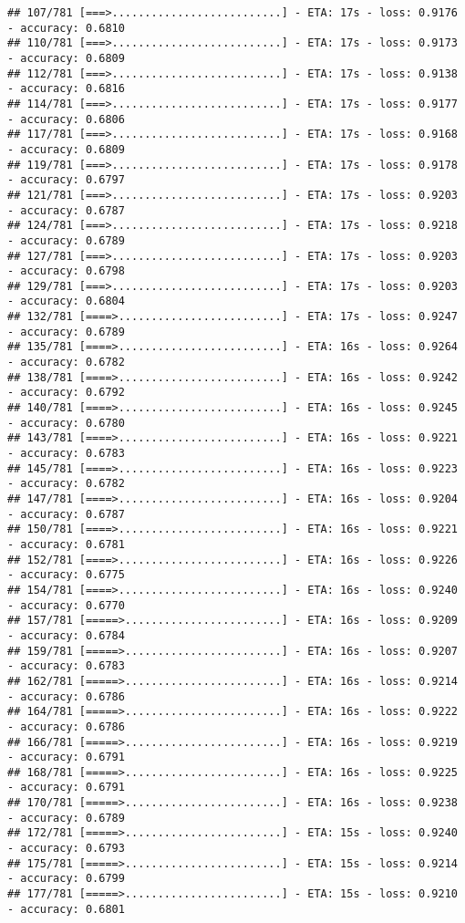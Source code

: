 \documentclass[
]{article}
\begin{document}
\begin{verbatim}
## 107/781 [===>..........................] - ETA: 17s - loss: 0.9176 - accuracy: 0.6810
## 110/781 [===>..........................] - ETA: 17s - loss: 0.9173 - accuracy: 0.6809
## 112/781 [===>..........................] - ETA: 17s - loss: 0.9138 - accuracy: 0.6816
## 114/781 [===>..........................] - ETA: 17s - loss: 0.9177 - accuracy: 0.6806
## 117/781 [===>..........................] - ETA: 17s - loss: 0.9168 - accuracy: 0.6809
## 119/781 [===>..........................] - ETA: 17s - loss: 0.9178 - accuracy: 0.6797
## 121/781 [===>..........................] - ETA: 17s - loss: 0.9203 - accuracy: 0.6787
## 124/781 [===>..........................] - ETA: 17s - loss: 0.9218 - accuracy: 0.6789
## 127/781 [===>..........................] - ETA: 17s - loss: 0.9203 - accuracy: 0.6798
## 129/781 [===>..........................] - ETA: 17s - loss: 0.9203 - accuracy: 0.6804
## 132/781 [====>.........................] - ETA: 17s - loss: 0.9247 - accuracy: 0.6789
## 135/781 [====>.........................] - ETA: 16s - loss: 0.9264 - accuracy: 0.6782
## 138/781 [====>.........................] - ETA: 16s - loss: 0.9242 - accuracy: 0.6792
## 140/781 [====>.........................] - ETA: 16s - loss: 0.9245 - accuracy: 0.6780
## 143/781 [====>.........................] - ETA: 16s - loss: 0.9221 - accuracy: 0.6783
## 145/781 [====>.........................] - ETA: 16s - loss: 0.9223 - accuracy: 0.6782
## 147/781 [====>.........................] - ETA: 16s - loss: 0.9204 - accuracy: 0.6787
## 150/781 [====>.........................] - ETA: 16s - loss: 0.9221 - accuracy: 0.6781
## 152/781 [====>.........................] - ETA: 16s - loss: 0.9226 - accuracy: 0.6775
## 154/781 [====>.........................] - ETA: 16s - loss: 0.9240 - accuracy: 0.6770
## 157/781 [=====>........................] - ETA: 16s - loss: 0.9209 - accuracy: 0.6784
## 159/781 [=====>........................] - ETA: 16s - loss: 0.9207 - accuracy: 0.6783
## 162/781 [=====>........................] - ETA: 16s - loss: 0.9214 - accuracy: 0.6786
## 164/781 [=====>........................] - ETA: 16s - loss: 0.9222 - accuracy: 0.6786
## 166/781 [=====>........................] - ETA: 16s - loss: 0.9219 - accuracy: 0.6791
## 168/781 [=====>........................] - ETA: 16s - loss: 0.9225 - accuracy: 0.6791
## 170/781 [=====>........................] - ETA: 16s - loss: 0.9238 - accuracy: 0.6789
## 172/781 [=====>........................] - ETA: 15s - loss: 0.9240 - accuracy: 0.6793
## 175/781 [=====>........................] - ETA: 15s - loss: 0.9214 - accuracy: 0.6799
## 177/781 [=====>........................] - ETA: 15s - loss: 0.9210 - accuracy: 0.6801

\end{verbatim}
\end{document}
